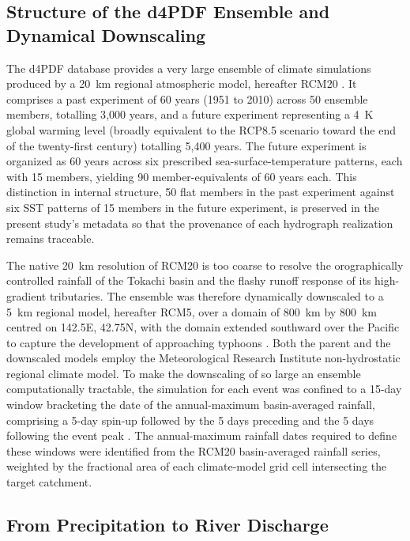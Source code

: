 \subsection{Structure of the d4PDF Ensemble and Dynamical Downscaling}
\label{subsec: Structure of the d4PDF Ensemble and Dynamical Downscaling}

The d4PDF database provides a very large ensemble of climate simulations produced by a 20~km regional atmospheric model, hereafter RCM20 \parencite{mizuta_2017}. It comprises a past experiment of 60 years (1951 to 2010) across 50 ensemble members, totalling 3{,}000 years, and a future experiment representing a 4~K global warming level (broadly equivalent to the RCP8.5 scenario toward the end of the twenty-first century) totalling 5{,}400 years. The future experiment is organized as 60 years across six prescribed sea-surface-temperature patterns, each with 15 members, yielding 90 member-equivalents of 60 years each. This distinction in internal structure, 50 flat members in the past experiment against six SST patterns of 15 members in the future experiment, is preserved in the present study's metadata so that the provenance of each hydrograph realization remains traceable.

The native 20~km resolution of RCM20 is too coarse to resolve the orographically controlled rainfall of the Tokachi basin and the flashy runoff response of its high-gradient tributaries. The ensemble was therefore dynamically downscaled to a 5~km regional model, hereafter RCM5, over a domain of 800~km by 800~km centred on 142.5\textdegree{}E, 42.75\textdegree{}N, with the domain extended southward over the Pacific to capture the development of approaching typhoons \parencite{yamada_2018}. Both the parent and the downscaled models employ the Meteorological Research Institute non-hydrostatic regional climate model. To make the downscaling of so large an ensemble computationally tractable, the simulation for each event was confined to a 15-day window bracketing the date of the annual-maximum basin-averaged rainfall, comprising a 5-day spin-up followed by the 5 days preceding and the 5 days following the event peak \parencite{yamada_2018}. The annual-maximum rainfall dates required to define these windows were identified from the RCM20 basin-averaged rainfall series, weighted by the fractional area of each climate-model grid cell intersecting the target catchment.

\subsection{From Precipitation to River Discharge}
\label{subsec: From Precipitation to River Discharge}

